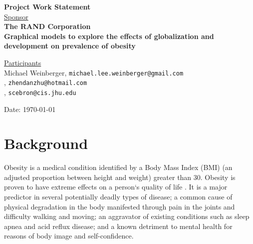 \documentclass[12pt,letterpaper]{article}
\theoremstyle{definition}
\begin{document}
\def\shiftdowna{0.32in}  %
\def\shiftdownb{0.22in}  %

\graphicspath{{./pictures/}}


\begin{center}
\textbf{{\large Project Work Statement}}\\


\vspace \shiftdowna
\underline {Sponsor}\\ 
\vspace{5pt}
\textbf{{\large The RAND Corporation}}\\


\vspace \shiftdowna
\textbf{{\large Graphical models to explore the effects of globalization and development on prevalence of obesity}}



\vspace \shiftdownb
\underline {Participants}\\
\vspace{5pt}
Michael Weinberger, \texttt{michael.lee.weinberger@gmail.com} \\
\vspace{3pt}
, \texttt{zhendanzhu@hotmail.com} \\
\vspace{3pt}
, \texttt{scebron@cis.jhu.edu}

\vspace \shiftdowna
Date: \today

\end{center}

\vfill  


\newpage

\section{Background} 
Obesity is a medical condition identified by a Body Mass Index (BMI) (an adjusted proportion between height and weight) greater than 30. Obesity is proven to have extreme effects on a person`s quality of life \cite{health}. It is a major predictor in several potentially deadly types of disease; a common cause of physical degradation in the body manifested through pain in the joints and difficulty walking and moving; an aggravator of existing conditions such as sleep apnea and acid reflux disease; and a known detriment to mental health for reasons of body image and self-confidence.
\end{document}
